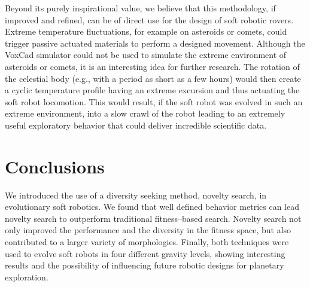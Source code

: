 \documentclass{sig-alternate}
\begin{document}
Beyond its purely inspirational value, we believe that this methodology, if improved and refined, can be of direct use for the design of soft robotic rovers. Extreme temperature fluctuations, for example on asteroids or comets, could trigger passive actuated materials to perform a designed movement. Although the VoxCad simulator could not be used to simulate the extreme environment of asteroids or comets, it is an interesting idea for further research. The rotation of the celestial body (e.g., with a period as short as a few hours) would then create a cyclic temperature profile having an extreme excursion and thus actuating the soft robot locomotion. This would result, if the soft robot was evolved in such an extreme environment, into a slow crawl of the robot leading to an extremely useful exploratory behavior that could deliver incredible scientific data. %

\section{Conclusions}
We introduced the use of a diversity seeking method, novelty search, in evolutionary soft robotics. 
We found that well defined behavior metrics can lead novelty search to outperform traditional fitness--based search. Novelty search not only improved the performance and the diversity in the fitness space, but also contributed to a larger variety of morphologies. Finally, both techniques were used to evolve soft robots in four different gravity levels, showing interesting results and the possibility of influencing future robotic designs for planetary exploration.



\balance\vspace{1.1cm}
\end{document}
